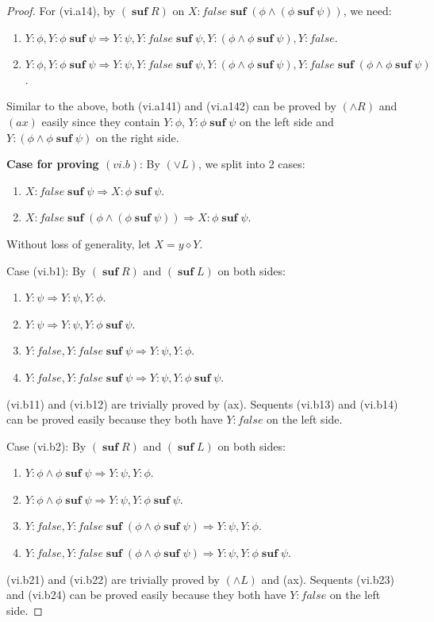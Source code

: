 \documentclass[manuscript,screen]{acmart}
\newcommand{\false}[0]{\mathit{false}}
\newcommand{\cat}[0]{\diamond}
\DeclareMathOperator{\osuf}{\mathbf{suf}}
\begin{document}
\begin{proof}
For (vi.a14), by $(\osuf R)$ on $X : \false\osuf(\phi\wedge(\phi\osuf\psi))$, we need:
\begin{enumerate}
\item[(vi.a141)] $Y : \phi, Y : \phi\osuf \psi\Rightarrow Y : \psi, Y : \false\osuf \psi, Y : (\phi\wedge \phi\osuf\psi), Y : \false$. 
\item[(vi.a142)] $Y : \phi, Y : \phi\osuf \psi\Rightarrow Y : \psi, Y : \false\osuf \psi, Y : (\phi\wedge \phi\osuf\psi), Y : \false\osuf (\phi\wedge \phi\osuf \psi)$.
\end{enumerate}
Similar to the above, both (vi.a141) and (vi.a142) can be proved by $(\wedge R)$ and $(ax)$ easily since they contain $Y : \phi$, $Y : \phi\osuf \psi$ on the left side and $Y : (\phi\wedge \phi\osuf \psi)$ on the right side.  



\textbf{Case for proving $(vi.b)$}: 
By $(\vee L)$, we split into 2 cases:
\begin{enumerate}
    \item[(vi.b1)] $X : \false\osuf \psi\Rightarrow X : \phi\osuf \psi$.
    \item[(vi.b2)] $X : \false\osuf(\phi\wedge(\phi\osuf \psi))\Rightarrow X : \phi\osuf \psi$.
\end{enumerate}

Without loss of generality, let $X = y\cat Y$. 

Case (vi.b1): By $(\osuf R)$ and $(\osuf L)$ on both sides:
\begin{enumerate}
\item[(vi.b11)] $Y : \psi\Rightarrow Y : \psi, Y : \phi$. 
\item[(vi.b12)] $Y : \psi\Rightarrow Y : \psi, Y : \phi\osuf \psi$. 
\item[(vi.b13)] $Y : \false, Y : \false \osuf \psi\Rightarrow Y : \psi, Y : \phi$. 
\item[(vi.b14)] $Y : \false, Y : \false \osuf \psi\Rightarrow Y : \psi, Y : \phi\osuf\psi$. 
\end{enumerate}
(vi.b11) and (vi.b12) are trivially proved by (ax). 
Sequents (vi.b13) and (vi.b14) can be proved easily because they both have $Y : \false$ on the left side. 

Case (vi.b2): By $(\osuf R)$ and $(\osuf L)$ on both sides:
\begin{enumerate}
\item[(vi.b21)] $Y : \phi\wedge \phi\osuf\psi\Rightarrow Y : \psi, Y : \phi$. 
\item[(vi.b22)] $Y : \phi\wedge \phi\osuf\psi\Rightarrow Y : \psi, Y : \phi\osuf\psi$. 
\item[(vi.b23)] $Y : \false, Y : \false \osuf (\phi\wedge \phi\osuf\psi)\Rightarrow Y : \psi, Y : \phi$. 
\item[(vi.b24)] $Y : \false, Y : \false \osuf (\phi\wedge \phi\osuf\psi)\Rightarrow Y : \psi, Y : \phi\osuf\psi$. 
\end{enumerate}
(vi.b21) and (vi.b22) are trivially proved by $(\wedge L)$ and (ax). 
Sequents (vi.b23) and (vi.b24) can be proved easily because they both have $Y : \false$ on the left side. 


\end{proof}
\end{document}
